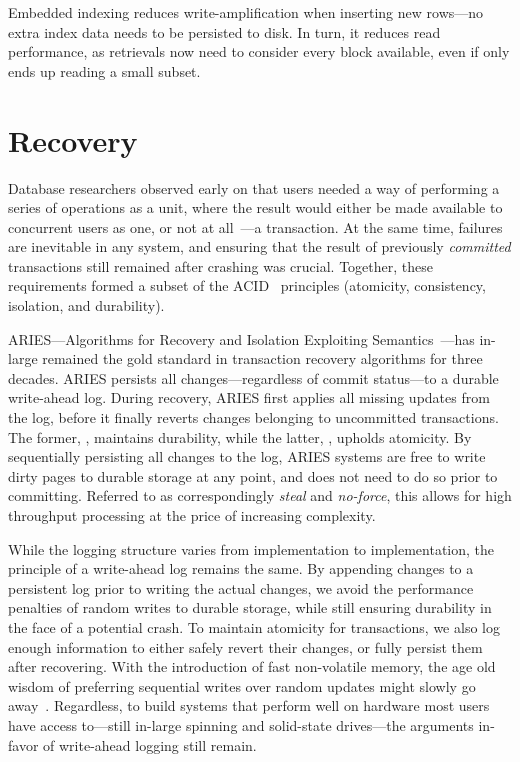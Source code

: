 Embedded indexing reduces write-amplification when inserting new rows---no
extra index data needs to be persisted to disk. In turn, it reduces read
performance, as retrievals now need to consider every block available, even if
only ends up reading a small subset.

\section{Recovery}

Database researchers observed early on that users needed a way of
performing a series of operations as a unit, where the result would either be
made available to concurrent users as one, or not at all~\cite{bernstein}---a
transaction. At the same time, failures are inevitable in any system, and
ensuring that the result of previously \textit{committed} transactions still
remained after crashing was crucial. Together, these requirements formed
a subset of the ACID~\cite{acid} principles (atomicity, consistency, isolation,
and durability).

ARIES---Algorithms for Recovery and Isolation Exploiting
Semantics~\cite{aries}---has in-large remained the gold standard in transaction
recovery algorithms for three decades. ARIES persists all changes---regardless
of commit status---to a durable write-ahead log. During recovery, ARIES first
applies all missing updates from the log, before it finally reverts changes
belonging to uncommitted transactions. The former, , maintains
durability, while the latter, , upholds atomicity. By sequentially
persisting all changes to the log, ARIES systems are free to write dirty pages
to durable storage at any point, and does not need to do so prior to committing.
Referred to as correspondingly \textit{steal} and \textit{no-force}, this allows
for high throughput processing at the price of increasing complexity.

While the logging structure varies from implementation to implementation, the
principle of a write-ahead log remains the same. By appending changes to a
persistent log prior to writing the actual changes, we avoid the performance
penalties of random writes to durable storage, while still ensuring durability
in the face of a potential crash. To maintain atomicity for transactions, we
also log enough information to either safely revert their changes, or fully
persist them after recovering. With the introduction of fast non-volatile
memory, the age old wisdom of preferring sequential writes over random updates
might slowly go away~\cite{mars, wbl}. Regardless, to build systems that perform
well on hardware most users have access to---still in-large spinning and
solid-state drives---the arguments in-favor of write-ahead logging still remain.

